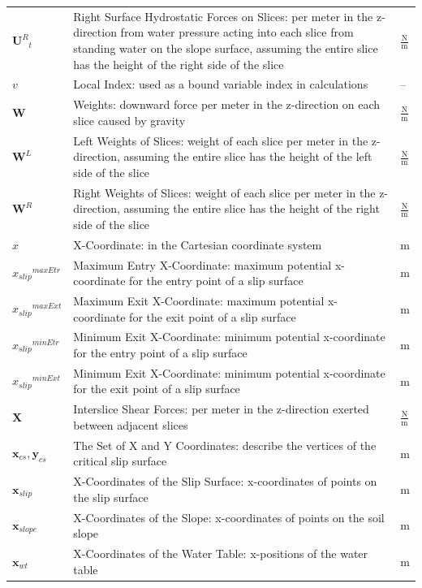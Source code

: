 \documentclass[12pt]{article}
\begin{document}
\begin{longtabu}{l X[l] l}
\\
${{\mathbf{U}^{R}}_{t}}$ & Right Surface Hydrostatic Forces on Slices: per meter in the z-direction from water pressure acting into each slice from standing water on the slope surface, assuming the entire slice has the height of the right side of the slice & $\frac{\text{N}}{\text{m}}$
\\
$v$ & Local Index: used as a bound variable index in calculations & --
\\
$\mathbf{W}$ & Weights: downward force per meter in the z-direction on each slice caused by gravity & $\frac{\text{N}}{\text{m}}$
\\
${\mathbf{W}^{L}}$ & Left Weights of Slices: weight of each slice per meter in the z-direction, assuming the entire slice has the height of the left side of the slice & $\frac{\text{N}}{\text{m}}$
\\
${\mathbf{W}^{R}}$ & Right Weights of Slices: weight of each slice per meter in the z-direction, assuming the entire slice has the height of the right side of the slice & $\frac{\text{N}}{\text{m}}$
\\
$x$ & X-Coordinate: in the Cartesian coordinate system & m
\\
${{x_{slip}}^{maxEtr}}$ & Maximum Entry X-Coordinate: maximum potential x-coordinate for the entry point of a slip surface & m
\\
${{x_{slip}}^{maxExt}}$ & Maximum Exit X-Coordinate: maximum potential x-coordinate for the exit point of a slip surface & m
\\
${{x_{slip}}^{minEtr}}$ & Minimum Exit X-Coordinate: minimum potential x-coordinate for the entry point of a slip surface & m
\\
${{x_{slip}}^{minExt}}$ & Minimum Exit X-Coordinate: minimum potential x-coordinate for the exit point of a slip surface & m
\\
$\mathbf{X}$ & Interslice Shear Forces: per meter in the z-direction exerted between adjacent slices & $\frac{\text{N}}{\text{m}}$
\\
${\mathbf{x}_{cs}},{\mathbf{y}_{cs}}$ & The Set of X and Y Coordinates: describe the vertices of the critical slip surface & m
\\
${\mathbf{x}_{slip}}$ & X-Coordinates of the Slip Surface: x-coordinates of points on the slip surface & m
\\
${\mathbf{x}_{slope}}$ & X-Coordinates of the Slope: x-coordinates of points on the soil slope & m
\\
${\mathbf{x}_{wt}}$ & X-Coordinates of the Water Table: x-positions of the water table & m

\end{longtabu}
\end{document}
